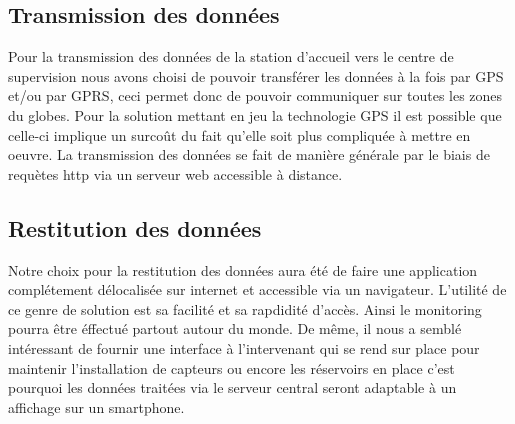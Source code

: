 \subsection{Transmission des données}
Pour la transmission des données de la station d'accueil vers le centre de supervision nous avons choisi de pouvoir transférer les données à la fois par GPS et/ou par GPRS, ceci permet donc de pouvoir communiquer sur toutes les zones du globes. Pour la solution mettant en jeu la technologie GPS il est possible que celle-ci implique un surcoût du fait qu'elle soit plus compliquée à mettre en oeuvre. La transmission des données se fait de manière générale par le biais de requètes http via un serveur web accessible à distance.
\medskip
\subsection{Restitution des données}
Notre choix pour la restitution des données aura été de faire une application complétement délocalisée sur internet et accessible via un navigateur. L'utilité de ce genre de solution est sa facilité et sa rapdidité d'accès. Ainsi le monitoring pourra être éffectué partout autour du monde. De même, il nous a semblé intéressant de fournir une interface à l'intervenant qui se rend sur place pour maintenir l'installation de capteurs ou encore les réservoirs en place c'est pourquoi les données traitées via le serveur central seront adaptable à un affichage sur un smartphone.
